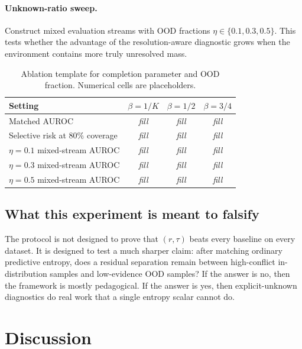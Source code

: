 \documentclass[11pt]{article}
\newcommand{\1}{\mathbf{1}}
\newcommand{\placeholder}[1]{\textit{#1}}
\begin{document}
\paragraph{Unknown-ratio sweep.}
Construct mixed evaluation streams with OOD fractions $\eta\in\{0.1,0.3,0.5\}$. This tests whether the advantage of the resolution-aware diagnostic grows when the environment contains more truly unresolved mass.

\begin{table}[t]
\centering
\caption{Ablation template for completion parameter and OOD fraction. Numerical cells are placeholders.}
\label{tab:ablation}
\begin{tabular}{lccc}
\toprule
Setting & $\beta=1/K$ & $\beta=1/2$ & $\beta=3/4$ \\
\midrule
Matched AUROC & \placeholder{fill} & \placeholder{fill} & \placeholder{fill} \\
Selective risk at $80\%$ coverage & \placeholder{fill} & \placeholder{fill} & \placeholder{fill} \\
\midrule
$\eta=0.1$ mixed-stream AUROC & \placeholder{fill} & \placeholder{fill} & \placeholder{fill} \\
$\eta=0.3$ mixed-stream AUROC & \placeholder{fill} & \placeholder{fill} & \placeholder{fill} \\
$\eta=0.5$ mixed-stream AUROC & \placeholder{fill} & \placeholder{fill} & \placeholder{fill} \\
\bottomrule
\end{tabular}
\end{table}

\subsection{What this experiment is meant to falsify}

The protocol is not designed to prove that $(r,\tau)$ beats every baseline on every dataset. It is designed to test a much sharper claim: after matching ordinary predictive entropy, does a residual separation remain between high-conflict in-distribution samples and low-evidence OOD samples? If the answer is no, then the framework is mostly pedagogical. If the answer is yes, then explicit-unknown diagnostics do real work that a single entropy scalar cannot do.

\section{Discussion}
\end{document}
